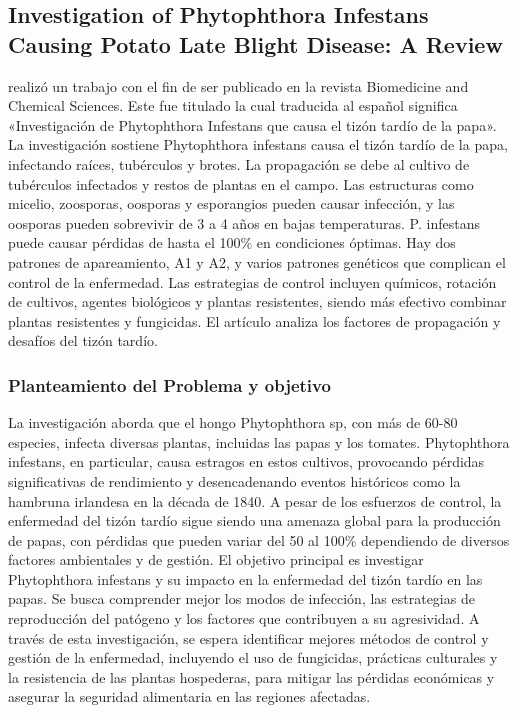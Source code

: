 \subsection{Investigation of Phytophthora Infestans Causing Potato Late Blight Disease: A Review \citep*{antecedente4}}

\citeauthor{antecedente4} realizó un trabajo con el fin de ser publicado en la revista Biomedicine and Chemical Sciences. Este fue titulado  la cual traducida al español significa  «Investigación de Phytophthora Infestans que causa el tizón tardío de la papa». La investigación sostiene Phytophthora infestans causa el tizón tardío de la papa, infectando raíces, tubérculos y brotes. La propagación se debe al cultivo de tubérculos infectados y restos de plantas en el campo. Las estructuras como micelio, zoosporas, oosporas y esporangios pueden causar infección, y las oosporas pueden sobrevivir de 3 a 4 años en bajas temperaturas. P. infestans puede causar pérdidas de hasta el 100\% en condiciones óptimas. Hay dos patrones de apareamiento, A1 y A2, y varios patrones genéticos que complican el control de la enfermedad. Las estrategias de control incluyen químicos, rotación de cultivos, agentes biológicos y plantas resistentes, siendo más efectivo combinar plantas resistentes y fungicidas. El artículo analiza los factores de propagación y desafíos del tizón tardío.
\subsubsection{Planteamiento del Problema y objetivo }

La investigación aborda que el hongo Phytophthora sp, con más de 60-80 especies, infecta diversas plantas, incluidas las papas y los tomates. Phytophthora infestans, en particular, causa estragos en estos cultivos, provocando pérdidas significativas de rendimiento y desencadenando eventos históricos como la hambruna irlandesa en la década de 1840. A pesar de los esfuerzos de control, la enfermedad del tizón tardío sigue siendo una amenaza global para la producción de papas, con pérdidas que pueden variar del 50 al 100\% dependiendo de diversos factores ambientales y de gestión. El objetivo principal es investigar Phytophthora infestans y su impacto en la enfermedad del tizón tardío en las papas. Se busca comprender mejor los modos de infección, las estrategias de reproducción del patógeno y los factores que contribuyen a su agresividad. A través de esta investigación, se espera identificar mejores métodos de control y gestión de la enfermedad, incluyendo el uso de fungicidas, prácticas culturales y la resistencia de las plantas hospederas, para mitigar las pérdidas económicas y asegurar la seguridad alimentaria en las regiones afectadas.

